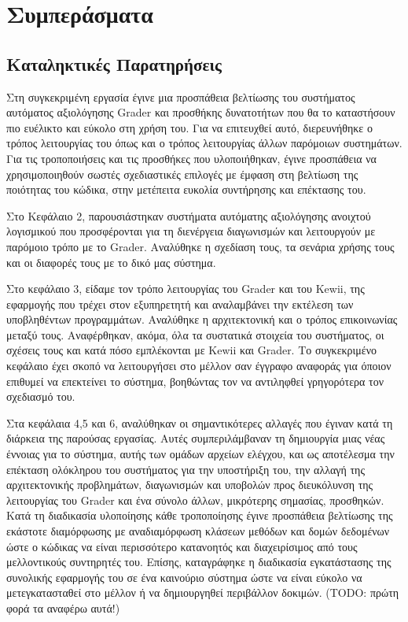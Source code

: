 \documentclass[diploma]{softlab-thesis}
\begin{document}
\chapter{Συμπεράσματα}

\section{Καταληκτικές Παρατηρήσεις}

Στη συγκεκριμένη εργασία έγινε μια προσπάθεια βελτίωσης του συστήματος
αυτόματος αξιολόγησης Grader και προσθήκης δυνατοτήτων που θα το καταστήσουν
πιο ευέλικτο και εύκολο στη χρήση του. Για να επιτευχθεί αυτό, διερευνήθηκε ο
τρόπος λειτουργίας του όπως και ο τρόπος λειτουργίας άλλων παρόμοιων
συστημάτων. Για τις τροποποιήσεις και τις προσθήκες που υλοποιήθηκαν, έγινε
προσπάθεια να χρησιμοποιηθούν σωστές σχεδιαστικές επιλογές με έμφαση στη
βελτίωση της ποιότητας του κώδικα, στην μετέπειτα ευκολία συντήρησης και
επέκτασης του.

\bigskip

Στο Κεφάλαιο 2, παρουσιάστηκαν συστήματα αυτόματης αξιολόγησης ανοιχτού λογισμικού
που προσφέρονται για τη διενέργεια διαγωνισμών και λειτουργούν με παρόμοιο τρόπο
με το Grader. Αναλύθηκε η σχεδίαση τους, τα σενάρια χρήσης τους και οι διαφορές
τους με το δικό μας σύστημα.

\bigskip

Στο κεφάλαιο 3, είδαμε τον τρόπο λειτουργίας του Grader και του Kewii, της
εφαρμογής που τρέχει στον εξυπηρετητή και αναλαμβάνει την εκτέλεση των
υποβληθέντων προγραμμάτων. Αναλύθηκε η αρχιτεκτονική και ο τρόπος επικοινωνίας
μεταξύ τους. Αναφέρθηκαν, ακόμα, όλα τα συστατικά στοιχεία του συστήματος, οι
σχέσεις τους και κατά πόσο εμπλέκονται με Kewii και Grader. Το συγκεκριμένο
κεφάλαιο έχει σκοπό να λειτουργήσει στο μέλλον σαν έγγραφο αναφοράς για όποιον
επιθυμεί να επεκτείνει το σύστημα, βοηθώντας τον να αντιληφθεί γρηγορότερα τον
σχεδιασμό του.

\bigskip

Στα κεφάλαια 4,5 και 6, αναλύθηκαν οι σημαντικότερες αλλαγές που έγιναν κατά τη
διάρκεια της παρούσας εργασίας. Αυτές συμπεριλάμβαναν τη δημιουργία μιας νέας
έννοιας για το σύστημα, αυτής των ομάδων αρχείων ελέγχου, και ως αποτέλεσμα την
επέκταση ολόκληρου του συστήματος για την υποστήριξη του, την αλλαγή της
αρχιτεκτονικής προβλημάτων, διαγωνισμών και υποβολών προς διευκόλυνση της
λειτουργίας του Grader και ένα σύνολο άλλων, μικρότερης σημασίας, προσθηκών.
Κατά τη διαδικασία υλοποίησης κάθε τροποποίησης έγινε προσπάθεια βελτίωσης της
εκάστοτε διαμόρφωσης με αναδιαμόρφωση κλάσεων μεθόδων και δομών δεδομένων ώστε
ο κώδικας να είναι περισσότερο κατανοητός και διαχειρίσιμος από τους μελλοντικούς
συντηρητές του. Επίσης, καταγράφηκε η διαδικασία εγκατάστασης της συνολικής
εφαρμογής του σε ένα καινούριο σύστημα ώστε να είναι εύκολο να μετεγκατασταθεί
στο μέλλον ή να δημιουργηθεί περιβάλλον δοκιμών. (TODO: πρώτη φορά τα αναφέρω αυτά!)
\end{document}
